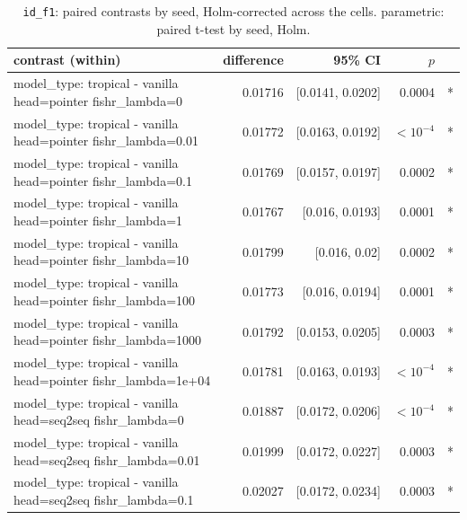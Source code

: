 \documentclass[10pt]{article}
\makeatletter
\newcommand{\stackcell}[1]{\begin{tabular}[t]{@{}l@{}}#1\end{tabular}}
\makeatother
\begin{document}
{\small
\begin{longtable}{lrrrl}
\caption{\texttt{id\_f1}: paired contrasts by seed, Holm-corrected across the cells. parametric: paired t-test by seed, Holm.}\label{tab:paired-id_f1}\\
\toprule
contrast (within) & difference & 95\% CI & $p$ & \\
\midrule
\endhead
\stackcell{model\_type: tropical - vanilla\\\footnotesize head=pointer fishr\_lambda=0 } & 0.01716 & [0.0141, 0.0202] & 0.0004 & *\\
\stackcell{model\_type: tropical - vanilla\\\footnotesize head=pointer fishr\_lambda=0.01 } & 0.01772 & [0.0163, 0.0192] & $<10^{-4}$ & *\\
\stackcell{model\_type: tropical - vanilla\\\footnotesize head=pointer fishr\_lambda=0.1 } & 0.01769 & [0.0157, 0.0197] & 0.0002 & *\\
\stackcell{model\_type: tropical - vanilla\\\footnotesize head=pointer fishr\_lambda=1 } & 0.01767 & [0.016, 0.0193] & 0.0001 & *\\
\stackcell{model\_type: tropical - vanilla\\\footnotesize head=pointer fishr\_lambda=10 } & 0.01799 & [0.016, 0.02] & 0.0002 & *\\
\stackcell{model\_type: tropical - vanilla\\\footnotesize head=pointer fishr\_lambda=100 } & 0.01773 & [0.016, 0.0194] & 0.0001 & *\\
\stackcell{model\_type: tropical - vanilla\\\footnotesize head=pointer fishr\_lambda=1000 } & 0.01792 & [0.0153, 0.0205] & 0.0003 & *\\
\stackcell{model\_type: tropical - vanilla\\\footnotesize head=pointer fishr\_lambda=1e+04 } & 0.01781 & [0.0163, 0.0193] & $<10^{-4}$ & *\\
\stackcell{model\_type: tropical - vanilla\\\footnotesize head=seq2seq fishr\_lambda=0 } & 0.01887 & [0.0172, 0.0206] & $<10^{-4}$ & *\\
\stackcell{model\_type: tropical - vanilla\\\footnotesize head=seq2seq fishr\_lambda=0.01 } & 0.01999 & [0.0172, 0.0227] & 0.0003 & *\\
\stackcell{model\_type: tropical - vanilla\\\footnotesize head=seq2seq fishr\_lambda=0.1 } & 0.02027 & [0.0172, 0.0234] & 0.0003 & *\\

\end{longtable}}
\end{document}
